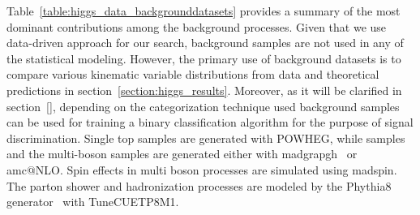 Table~\ref{table:higgs_data_backgrounddatasets} provides a summary of the most dominant contributions among the background processes. Given that we use data-driven approach for our search, background samples are not used in any of the statistical modeling. However, the primary use of background datasets is to compare various kinematic variable distributions from data and theoretical predictions in section~\ref{section:higgs_results}. Moreover, as it will be clarified in section~\ref{}, depending on the categorization technique used background samples can be used for training a binary classification algorithm for the purpose of signal discrimination. Single top samples are generated with {\sc POWHEG}, while \ttbar samples and the multi-boson samples are generated either with {\sc madgrapgh}~\cite{Alwall:2011uj} or {amc@NLO}. Spin effects in multi boson processes are simulated using madspin. The parton shower and hadronization processes are modeled by the {\sc Phythia8} generator~\cite{Sjostrand:2007gs} with TuneCUETP8M1.



